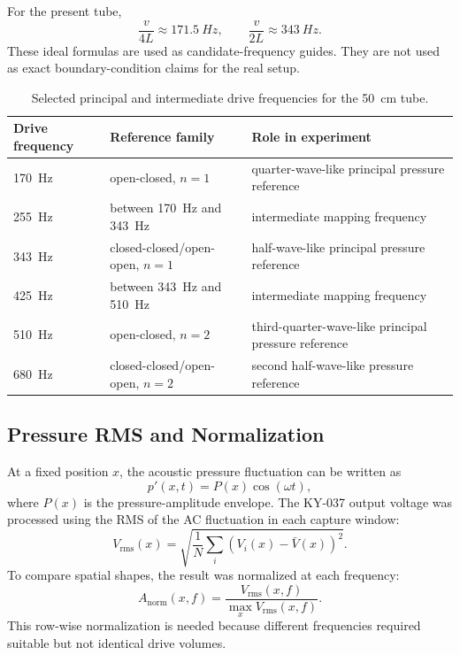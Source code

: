 \documentclass[11pt,a4paper]{article}
\newcommand{\rms}{V_{\mathrm{rms}}}
\newcommand{\anorm}{A_{\mathrm{norm}}}
\begin{document}
For the present tube,
\begin{equation}
  \frac{v}{4L}\approx\SI{171.5}{Hz},\qquad
  \frac{v}{2L}\approx\SI{343}{Hz}.
\end{equation}
These ideal formulas are used as candidate-frequency guides. They are not used as exact boundary-condition claims for the real setup.

\begin{table}[H]
  \centering
  \caption{Selected principal and intermediate drive frequencies for the \SI{50}{cm} tube.}
  \begin{tabularx}{\linewidth}{>{\raggedleft\arraybackslash}p{2.0cm} X X}
    \toprule
    Drive frequency & Reference family & Role in experiment \\
    \midrule
    \SI{170}{Hz} & open-closed, \(n=1\) & quarter-wave-like principal pressure reference \\
    \SI{255}{Hz} & between \SI{170}{Hz} and \SI{343}{Hz} & intermediate mapping frequency \\
    \SI{343}{Hz} & closed-closed/open-open, \(n=1\) & half-wave-like principal pressure reference \\
    \SI{425}{Hz} & between \SI{343}{Hz} and \SI{510}{Hz} & intermediate mapping frequency \\
    \SI{510}{Hz} & open-closed, \(n=2\) & third-quarter-wave-like principal pressure reference \\
    \SI{680}{Hz} & closed-closed/open-open, \(n=2\) & second half-wave-like pressure reference \\
    \bottomrule
  \end{tabularx}
\end{table}

\subsection{Pressure RMS and Normalization}

At a fixed position \(x\), the acoustic pressure fluctuation can be written as
\begin{equation}
  p'(x,t)=P(x)\cos(\omega t),
\end{equation}
where \(P(x)\) is the pressure-amplitude envelope. The KY-037 output voltage was processed using the RMS of the AC fluctuation in each capture window:
\begin{equation}
  \rms(x)=\sqrt{\frac{1}{N}\sum_i\left(V_i(x)-\bar{V}(x)\right)^2}.
\end{equation}
To compare spatial shapes, the result was normalized at each frequency:
\begin{equation}
  \anorm(x,f)=\frac{\rms(x,f)}{\max_x \rms(x,f)}.
\end{equation}
This row-wise normalization is needed because different frequencies required suitable but not identical drive volumes.
\end{document}
